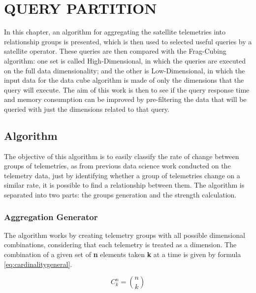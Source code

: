 
\chapter{QUERY PARTITION}\label{ch:querypart}

In this chapter, an algorithm for aggregating the satellite telemetries into relationship groups is presented, which is then used to selected useful queries by a satellite operator.
These queries are then compared with the Frag-Cubing algorithm: one set is called High-Dimensional, in which the queries are executed on the full data dimensionality; and the other is Low-Dimensional, in which the input data for the data cube algorithm is made of only the dimensions that the query will execute.
The aim of this work is then to see if the query response time and memory consumption can be improved by pre-filtering the data that will be queried with just the dimensions related to that query.

\section{Algorithm}\label{ch:querypart:heur}

The objective of this algorithm is to easily classify the rate of change between groups of telemetries, as from previous data science work conducted on the telemetry data, just by identifying whether a group of telemetries change on a similar rate, it is possible to find a relationship between them.
The algorithm is separated into two parts: the groups generation and the strength calculation.

\hypertarget{aggregation-generator}{%
\subsection{Aggregation Generator}\label{ch:querypart:heur:agg}}

The algorithm works by creating telemetry groups with all possible dimensional combinations, considering that each telemetry is treated as a dimension.
The combination of a given set of \textbf{n} elements taken \textbf{k} at a time is given by formula \ref{eq:cardinalitygeneral}.

\begin{equation} \label{eq:cardinalitygeneral}
C_k^n = \binom{n}{k}
\end{equation}


